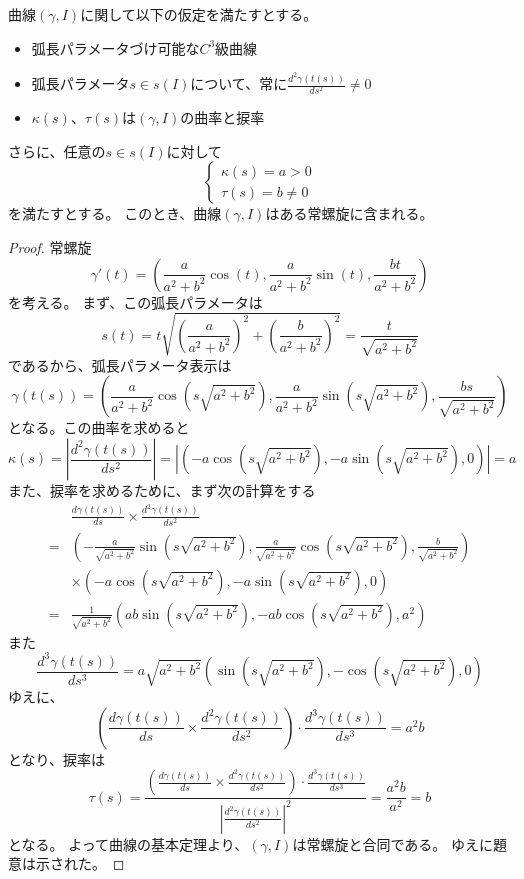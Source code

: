 \begin{example}
  曲線$(\gamma,I)$に関して以下の仮定を満たすとする。
  \begin{itemize}
    \item 弧長パラメータづけ可能な$C^3$級曲線
    \item 弧長パラメータ$s\in s(I)$について、常に$\frac{d^2\gamma(t(s))}{ds^2}\neq0$
    \item $\kappa(s)$、$\tau(s)$は$(\gamma,I)$の曲率と捩率
  \end{itemize}
  さらに、任意の$s\in s(I)$に対して
  \[
    \begin{cases}
      \kappa(s)=a>0\\
      \tau(s)=b\neq0
    \end{cases}
  \]
  を満たすとする。
  このとき、曲線$(\gamma,I)$はある常螺旋に含まれる。
\end{example}
\begin{proof}
  常螺旋
  \[
    \gamma'(t)=\left(\frac{a}{a^2+b^2}\cos(t),\frac{a}{a^2+b^2}\sin(t),\frac{bt}{a^2+b^2}\right)
  \]
  を考える。
  まず、この弧長パラメータは
  \[
    s(t)=t\sqrt{\left(\frac{a}{a^2+b^2}\right)^2+\left(\frac{b}{a^2+b^2}\right)^2}=\frac{t}{\sqrt{a^2+b^2}}
  \]
  であるから、弧長パラメータ表示は
  \[
    \gamma(t(s))=\left(\frac{a}{a^2+b^2}\cos(s\sqrt{a^2+b^2}),\frac{a}{a^2+b^2}\sin(s\sqrt{a^2+b^2}),\frac{bs}{\sqrt{a^2+b^2}}\right)
  \]
  となる。この曲率を求めると
  \[
    \kappa(s)=\left|\frac{d^2\gamma(t(s))}{ds^2}\right|=|(-a\cos(s\sqrt{a^2+b^2}),-a\sin(s\sqrt{a^2+b^2}),0)|=a
  \]
  また、捩率を求めるために、まず次の計算をする
  \begin{align*}
    &\frac{d\gamma(t(s))}{ds}\times\frac{d^2\gamma(t(s))}{ds^2}\\
    =&(-\frac{a}{\sqrt{a^2+b^2}}\sin(s\sqrt{a^2+b^2}),\frac{a}{\sqrt{a^2+b^2}}\cos(s\sqrt{a^2+b^2}),\frac{b}{\sqrt{a^2+b^2}})\\
    &\times(-a\cos(s\sqrt{a^2+b^2}),-a\sin(s\sqrt{a^2+b^2}),0)\\
    =&\frac{1}{\sqrt{a^2+b^2}}(ab\sin(s\sqrt{a^2+b^2}),-ab\cos(s\sqrt{a^2+b^2}),a^2)
  \end{align*}
  また
  \[
    \frac{d^3\gamma(t(s))}{ds^3}=a\sqrt{a^2+b^2}(\sin(s\sqrt{a^2+b^2}),-\cos(s\sqrt{a^2+b^2}),0)
  \]
  ゆえに、
  \[
    \left(\frac{d\gamma(t(s))}{ds}\times\frac{d^2\gamma(t(s))}{ds^2}\right)\cdot\frac{d^3\gamma(t(s))}{ds^3}=a^2b
  \]
  となり、捩率は
  \[
    \tau(s)=\frac{\left(\frac{d\gamma(t(s))}{ds}\times\frac{d^2\gamma(t(s))}{ds^2}\right)\cdot\frac{d^3\gamma(t(s))}{ds^3}}{\left|\frac{d^2\gamma(t(s))}{ds^2}\right|^2}=\frac{a^2b}{a^2}=b
  \]
  となる。
  よって曲線の基本定理より、$(\gamma,I)$は常螺旋と合同である。
  ゆえに題意は示された。
\end{proof}




